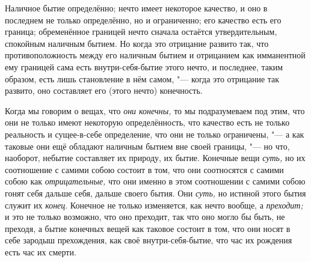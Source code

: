 Наличное бытие определённо; нечто имеет некоторое качество, и оно в последнем
не только определённо, но и ограниченно; его качество есть его граница;
обременённое границей нечто сначала остаётся утвердительным, спокойным
наличным бытием. Но когда это отрицание развито так, что противоположность
между его наличным бытием и отрицанием как имманентной ему границей сама
есть внутри-себя-бытие этого нечто, и последнее, таким образом, есть лишь
становление в нём самом, "--- когда это отрицание так развито, оно составляет
его (этого нечто) конечность.

Когда мы говорим о вещах, что {\em они конечны,} то мы
подразумеваем под этим, что они не только имеют некоторую определённость,
что качество есть не только реальность и сущее-в-себе определение, что они не
только ограничены, "--- а как таковые они ещё обладают наличным бытием вне
своей границы, "--- но что, наоборот, небытие составляет их природу, их бытие.
Конечные вещи {\em суть,} но их соотношение с самими
собою состоит в том, что они соотносятся с самими собою как
{\em отрицательные,} что они именно в этом соотношении
с самими собою гонят себя дальше себя, дальше своего бытия. Они
{\em суть,} но истиной этого бытия служит их
{\em конец}. Конечное не только изменяется, как нечто
вообще, а {\em преходит;} и это не только возможно, что
оно преходит, так что оно могло бы быть, не преходя, а бытие конечных вещей
как таковое состоит в том, что они носят в себе зародыш прехождения, как
своё внутри-себя-бытие, что час их рождения есть час их смерти.


